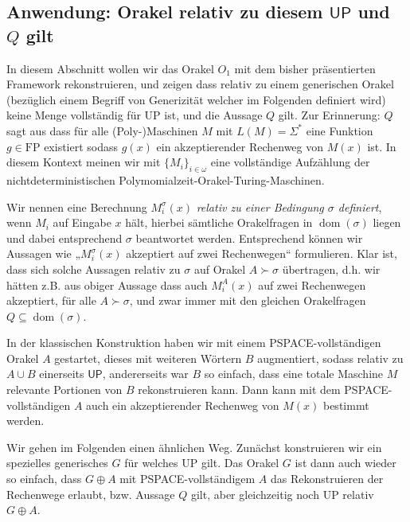 \documentclass[nofonts]{uebung}
\theoremstyle{definition}
\def\FP{\ensuremath{\mathrm{FP}}}
\def\UP{\ensuremath{\mathrm{UP}}}
\DeclareMathOperator{\dom}{dom}
\def\hUP{\ensuremath{\mathsf{UP}}}
\begin{document}

\subsection{Anwendung: Orakel relativ zu diesem $\hUP$ und $Q$ gilt}

In diesem Abschnitt wollen wir das Orakel $O_1$ mit dem bisher präsentierten Framework rekonstruieren, und zeigen dass relativ zu einem generischen Orakel (bezüglich einem Begriff von Generizität welcher im Folgenden definiert wird) keine Menge vollständig für $\UP$ ist, und die Aussage $Q$ gilt. Zur Erinnerung: $Q$ sagt aus dass für alle (Poly-)Maschinen $M$ mit $L(M)=\Sigma^*$ eine Funktion $g\in\FP$ existiert sodass $g(x)$ ein akzeptierender Rechenweg von $M(x)$ ist.
In diesem Kontext meinen wir mit $\{M_i\}_{i\in\omega}$ eine vollständige Aufzählung der nichtdeterministischen Polymomialzeit-Orakel-Turing-Maschinen.

Wir nennen eine Berechnung $M_i^\sigma(x)$ \emph{relativ zu einer Bedingung $\sigma$ definiert}, wenn $M_i$ auf Eingabe $x$ hält, hierbei sämtliche Orakelfragen in $\dom(\sigma)$ liegen und dabei entsprechend $\sigma$ beantwortet werden.
Entsprechend können wir Aussagen wie „$M_i^\sigma(x)$ akzeptiert auf zwei Rechenwegen“ formulieren.
Klar ist, dass sich solche Aussagen relativ zu $\sigma$ auf Orakel $A\succ \sigma$ übertragen, d.h. wir hätten z.B. aus obiger Aussage dass auch $M_i^A(x)$ auf zwei Rechenwegen akzeptiert, für alle $A\succ\sigma$, und zwar immer mit den gleichen Orakelfragen $Q\subseteq \dom(\sigma)$.

In der klassischen Konstruktion haben wir mit einem PSPACE-vollständigen Orakel $A$ gestartet, dieses mit weiteren Wörtern $B$ augmentiert, sodass relativ zu $A\cup B$ einerseits $\hUP$, andererseits war $B$ so einfach, dass eine totale Maschine $M$ relevante Portionen von $B$ rekonstruieren kann. Dann kann mit dem PSPACE-vollständigen $A$ auch ein akzeptierender Rechenweg von $M(x)$ bestimmt werden.

Wir gehen im Folgenden einen ähnlichen Weg. Zunächst konstruieren wir ein spezielles generisches $G$ für welches $\UP$ gilt. Das Orakel $G$ ist dann auch wieder so einfach, dass $G\oplus A$ mit PSPACE-vollständigem $A$ das Rekonstruieren der Rechenwege erlaubt, bzw. Aussage $Q$ gilt, aber gleichzeitig noch $\UP$ relativ $G\oplus A$.
\end{document}
